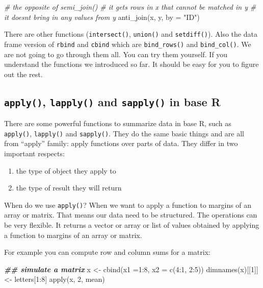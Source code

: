 \documentclass[
  12pt,
]{krantz}
\makeatletter
\newenvironment{Shaded}{\begin{snugshade}}{\end{snugshade}}
\newcommand{\AttributeTok}[1]{\textcolor[rgb]{0.61,0.61,0.61}{#1}}
\newcommand{\CommentTok}[1]{\textcolor[rgb]{0.37,0.37,0.37}{\textit{#1}}}
\newcommand{\DecValTok}[1]{\textcolor[rgb]{0.06,0.06,0.06}{#1}}
\newcommand{\DocumentationTok}[1]{\textcolor[rgb]{0.37,0.37,0.37}{\textbf{\textit{#1}}}}
\newcommand{\FunctionTok}[1]{\textcolor[rgb]{0,0,0}{#1}}
\newcommand{\NormalTok}[1]{#1}
\newcommand{\OtherTok}[1]{\textcolor[rgb]{0.37,0.37,0.37}{#1}}
\newcommand{\SpecialCharTok}[1]{\textcolor[rgb]{0,0,0}{#1}}
\newcommand{\StringTok}[1]{\textcolor[rgb]{0.5,0.5,0.5}{#1}}
\providecommand{\tightlist}{%
  \setlength{\itemsep}{0pt}\setlength{\parskip}{0pt}}
\newenvironment{kframe}{%
\medskip{}
\setlength{\fboxsep}{.8em}
 \def\at@end@of@kframe{}%
 \ifinner\ifhmode%
  \def\at@end@of@kframe{\end{minipage}}%
  \begin{minipage}{\columnwidth}%
 \fi\fi%
 \def\FrameCommand##1{\hskip\@totalleftmargin \hskip-\fboxsep
 \colorbox{shadecolor}{##1}\hskip-\fboxsep
     \hskip-\linewidth \hskip-\@totalleftmargin \hskip\columnwidth}%
 \MakeFramed {\advance\hsize-\width
   \@totalleftmargin\z@ \linewidth\hsize
   \@setminipage}}%
 {\par\unskip\endMakeFramed%
 \at@end@of@kframe}
\renewenvironment{Shaded}{\begin{kframe}}{\end{kframe}}
\makeatother
\begin{document}
\begin{Shaded}
\begin{Highlighting}[]
\CommentTok{\# the opposite of  semi\_join()}
\CommentTok{\# it gets rows in x that cannot be matched in y}
\CommentTok{\# it doesn\textquotesingle{}t bring in any values from y}
\FunctionTok{anti\_join}\NormalTok{(x, y, }\AttributeTok{by =} \StringTok{"ID"}\NormalTok{)}
\end{Highlighting}
\end{Shaded}

There are other functions (\texttt{intersect()}, \texttt{union()} and \texttt{setdiff()}). Also the data frame version of \texttt{rbind} and \texttt{cbind} which are \texttt{bind\_rows()} and \texttt{bind\_col()}. We are not going to go through them all. You can try them yourself. If you understand the functions we introduced so far. It should be easy for you to figure out the rest.

\hypertarget{applyfamilyinbaser}{%
\subsection{\texorpdfstring{\texttt{apply()}, \texttt{lapply()} and \texttt{sapply()} in base R}{apply(), lapply() and sapply() in base R}}\label{applyfamilyinbaser}}

There are some powerful functions to summarize data in base R, such as \texttt{apply()}, \texttt{lapply()} and \texttt{sapply()}. They do the same basic things and are all from ``apply'' family: apply functions over parts of data. They differ in two important respects:

\begin{enumerate}
\def\labelenumi{\arabic{enumi}.}
\tightlist
\item
  the type of object they apply to
\item
  the type of result they will return
\end{enumerate}

When do we use \texttt{apply()}? When we want to apply a function to margins of an array or matrix. That means our data need to be structured. The operations can be very flexible. It returns a vector or array or list of values obtained by applying a function to margins of an array or matrix.

For example you can compute row and column sums for a matrix:

\begin{Shaded}
\begin{Highlighting}[]
\DocumentationTok{\#\# simulate a matrix}
\NormalTok{x }\OtherTok{\textless{}{-}} \FunctionTok{cbind}\NormalTok{(}\AttributeTok{x1 =}\DecValTok{1}\SpecialCharTok{:}\DecValTok{8}\NormalTok{, }\AttributeTok{x2 =} \FunctionTok{c}\NormalTok{(}\DecValTok{4}\SpecialCharTok{:}\DecValTok{1}\NormalTok{, }\DecValTok{2}\SpecialCharTok{:}\DecValTok{5}\NormalTok{))}
\FunctionTok{dimnames}\NormalTok{(x)[[}\DecValTok{1}\NormalTok{]] }\OtherTok{\textless{}{-}}\NormalTok{ letters[}\DecValTok{1}\SpecialCharTok{:}\DecValTok{8}\NormalTok{]}
\FunctionTok{apply}\NormalTok{(x, }\DecValTok{2}\NormalTok{, mean)}
\end{Highlighting}
\end{Shaded}
\end{document}
